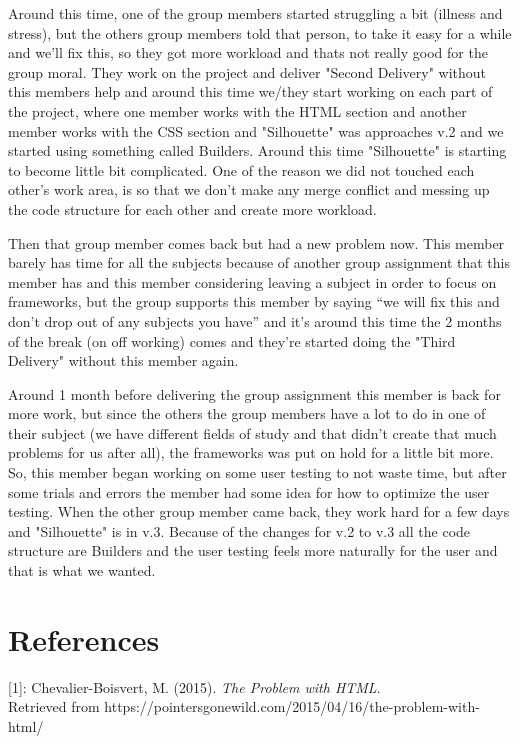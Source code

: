\documentclass[12pt]{article}
\begin{document}
    Around this time, one of the group members started struggling a bit (illness and stress), but the others group members told that person, to take it easy for a while and we'll fix this, so they got more workload and thats not really good for the group moral. They work on the project and deliver "Second Delivery" without this members help and around this time we/they start working on each part of the project, where one member works with the HTML section and another member works with the CSS section and "Silhouette" was approaches v.2 and we started using something called Builders. Around this time "Silhouette" is starting to become little bit complicated. One of the reason we did not touched each other's work area, is so that we don't make any merge conflict and messing up the code structure for each other and create more workload.

    Then that group member comes back but had a new problem now. This member barely has time for all the subjects because of another group assignment that this member has and this member considering leaving a subject in order to focus on frameworks, but the group supports this member by saying “we will fix this and don't drop out of any subjects you have” and it's around this time the 2 months of the break (on off working) comes and they're started doing the "Third Delivery" without this member again.

    Around 1 month before delivering the group assignment this member is back for more work, but since the others the group members have a lot to do in one of their subject (we have different fields of study and that didn't create that much problems for us after all), the frameworks was put on hold for a little bit more. So, this member began working on some user testing to not waste time, but after some trials and errors the member had some idea for how to optimize the user testing. When the other group member came back, they work hard for a few days and "Silhouette" is in v.3. Because of the changes for v.2 to v.3 all the code structure are Builders and the user testing feels more naturally for the user and that is what we wanted.

\newpage

\section{References}

[1]: Chevalier-Boisvert, M. (2015). \textit{The Problem with HTML}. \\ Retrieved from https://pointersgonewild.com/2015/04/16/the-problem-with-html/
\end{document}
